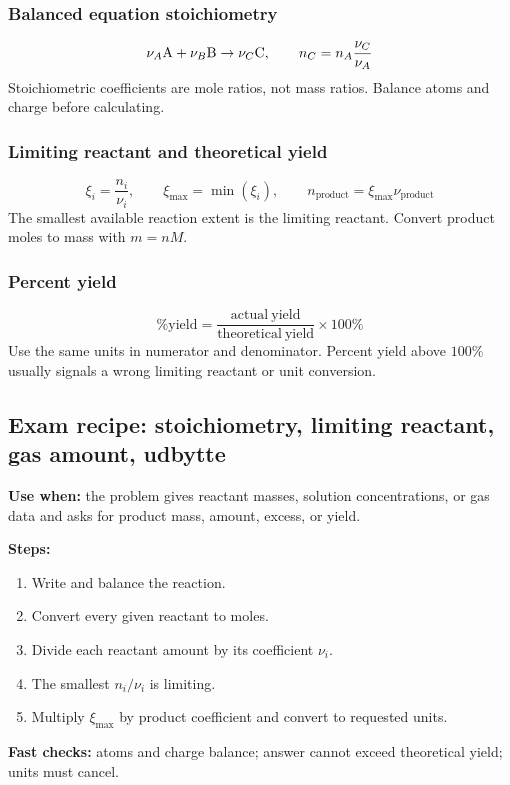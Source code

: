 \subsubsection{Balanced equation stoichiometry}
\[
\nu_A\ce{A}+\nu_B\ce{B}\rightarrow\nu_C\ce{C}, \qquad
n_C=n_A\frac{\nu_C}{\nu_A}
\]
Stoichiometric coefficients are mole ratios, not mass ratios. Balance atoms and charge before calculating.

\subsubsection{Limiting reactant and theoretical yield}
\[
\xi_i=\frac{n_i}{\nu_i}, \qquad
\xi_{\max}=\min(\xi_i), \qquad
n_{\mathrm{product}}=\xi_{\max}\nu_{\mathrm{product}}
\]
The smallest available reaction extent is the limiting reactant. Convert product moles to mass with \(m=nM\).

\subsubsection{Percent yield}
\[
\%\mathrm{yield}=\frac{\mathrm{actual\ yield}}{\mathrm{theoretical\ yield}}\times100\%
\]
Use the same units in numerator and denominator. Percent yield above \(100\%\) usually signals a wrong limiting reactant or unit conversion.

\subsection{Exam recipe: stoichiometry, limiting reactant, gas amount, udbytte}
\textbf{Use when:} the problem gives reactant masses, solution concentrations, or gas data and asks for product mass, amount, excess, or yield.

\textbf{Steps:}
\begin{enumerate}
    \item Write and balance the reaction.
    \item Convert every given reactant to moles.
    \item Divide each reactant amount by its coefficient \(\nu_i\).
    \item The smallest \(n_i/\nu_i\) is limiting.
    \item Multiply \(\xi_{\max}\) by product coefficient and convert to requested units.
\end{enumerate}

\textbf{Fast checks:} atoms and charge balance; answer cannot exceed theoretical yield; units must cancel.

